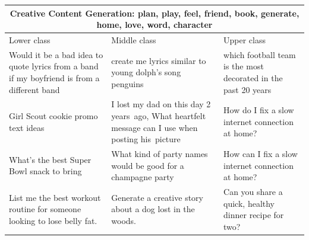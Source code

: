 \begin{table}[ht]
\centering
\small
\begin{tabular}{p{4.3cm}p{4.3cm}p{4.3cm}}
\toprule
\multicolumn{3}{c}{\textbf{Creative Content Generation: plan, play, feel, friend, book, generate, home, love, word, character}} \\
\midrule
Lower class & Middle class & Upper class \\
\midrule
Would it be a bad idea to quote lyrics from a band if my boyfriend is from a different band & create me lyrics similar to young dolph's song penguins & which football team is the most decorated in the past 20 years \\[4pt]
Girl Scout cookie promo text ideas & I lost my dad on this day 2 years ago, What heartfelt message can I use when posting his picture & How do I fix a slow internet connection at home? \\[4pt]
What's the best Super Bowl snack to bring & What kind of party names would be good for a champagne party & How can I fix a slow internet connection at home? \\[4pt]
List me the best workout routine for someone looking to lose belly fat. & Generate a creative story about a dog lost in the woods. & Can you share a quick, healthy dinner recipe for two? \\[4pt]

\end{tabular}
\end{table}
